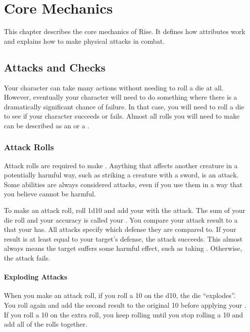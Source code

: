 \chapter{Core Mechanics}

This chapter describes the core mechanics of Rise.
It defines how attributes work and explains how to make physical attacks in combat.

\section{Attacks and Checks}\label{Attacks and Checks}
    Your character can take many actions without needing to roll a die at all.
    However, eventually your character will need to do something where there is a dramatically significant chance of failure.
    In that case, you will need to roll a die to see if your character succeeds or fails.
    Almost all rolls you will need to make can be described as an  or a .

    \subsection{Attack Rolls}
        Attack rolls are required to make .
        Anything that affects another creature in a potentially harmful way, such as striking a creature with a sword, is an attack.
        Some abilities are always considered attacks, even if you use them in a way that you believe cannot be harmful.

        To make an attack roll, roll 1d10 and add your  with the attack.
        The sum of your die roll and your accuracy is called your .
        You compare your attack result to a  that your  has.
        All attacks specify which defense they are compared to.
        If your result is at least equal to your target's defense, the attack succeeds.
        This almost always means the target suffers some harmful effect, such as taking .
        Otherwise, the attack fails.

        \subsubsection{Exploding Attacks}\label{Exploding Attacks}
            When you make an attack roll, if you roll a 10 on the d10, the die ``explodes''.
            You roll again and add the second result to the original 10 before applying your .
            If you roll a 10 on the extra roll, you keep rolling until you stop rolling a 10 and add all of the rolls together.

